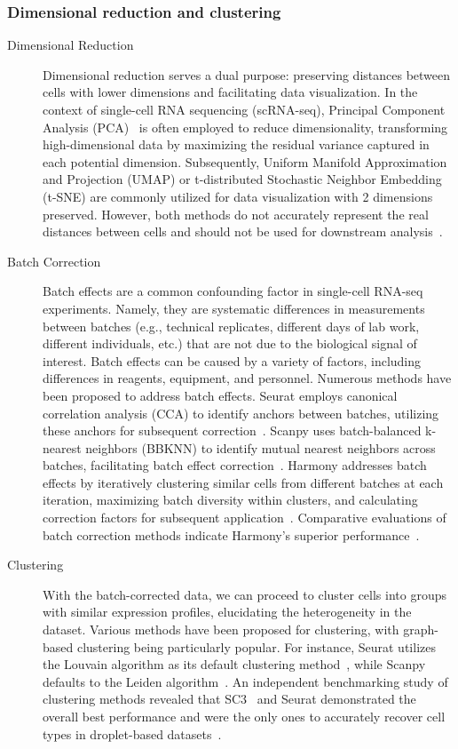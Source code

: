 \subsubsection{Dimensional reduction and clustering}
\label{background:sec2:dr_n_clustering}
\begin{description}
	\item[Dimensional Reduction]
	Dimensional reduction serves a dual purpose: preserving distances between cells with lower dimensions and facilitating data visualization. In the context of single-cell RNA sequencing (scRNA-seq), Principal Component Analysis (PCA)~\citep{hotelling1933pca} is often employed to reduce dimensionality, transforming high-dimensional data by maximizing the residual variance captured in each potential dimension. Subsequently, Uniform Manifold Approximation and Projection (UMAP) or t-distributed Stochastic Neighbor Embedding (t-SNE) are commonly utilized for data visualization with 2 dimensions preserved. However, both methods do not accurately represent the real distances between cells and should not be used for downstream analysis~\citep{mcinnes2018umap, van2008tsne}.

	\item[Batch Correction]
	Batch effects are a common confounding factor in single-cell RNA-seq experiments. Namely, they are systematic differences in measurements between batches (e.g., technical replicates, different days of lab work, different individuals, etc.) that are not due to the biological signal of interest. Batch effects can be caused by a variety of factors, including differences in reagents, equipment, and personnel. Numerous methods have been proposed to address batch effects. Seurat employs canonical correlation analysis (CCA) to identify anchors between batches, utilizing these anchors for subsequent correction~\citep{stuart2019seurat3}. Scanpy uses batch-balanced k-nearest neighbors (BBKNN) to identify mutual nearest neighbors across batches, facilitating batch effect correction~\citep{polanski2020bbknn}. Harmony addresses batch effects by iteratively clustering similar cells from different batches at each iteration, maximizing batch diversity within clusters, and calculating correction factors for subsequent application~\citep{korsunsky2019harmony}. Comparative evaluations of batch correction methods indicate Harmony's superior performance~\citep{tran2020benchmark}.

	\item[Clustering]
	With the batch-corrected data, we can proceed to cluster cells into groups with similar expression profiles, elucidating the heterogeneity in the dataset. Various methods have been proposed for clustering, with graph-based clustering being particularly popular. For instance, Seurat utilizes the Louvain algorithm as its default clustering method~\citep{stuart2019seurat3}, while Scanpy defaults to the Leiden algorithm~\citep{traag2019louvain}. An independent benchmarking study of clustering methods revealed that SC3~\citep{kiselev2017sc3} and Seurat demonstrated the overall best performance and were the only ones to accurately recover cell types in droplet-based datasets~\citep{duo2018benchclustering}.

\end{description}

